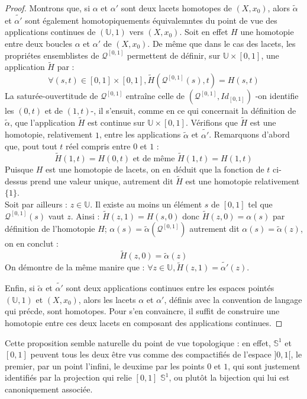 \begin{proof}
Montrons que, si $\alpha$ et $\alpha '$ sont deux lacets homotopes de $(X,x_0)$,%
alors $\tilde{\alpha}$ et $\tilde{\alpha '}$ sont \'egalement homotopiquements \'equivalemntes du point de vue des applications continues de $(\mathbb{U},1)$ vers $(X,x_0)$. %
Soit en effet $H$ une homotopie entre deux boucles $\alpha$ et $\alpha '$ de $(X,x_0)$. De m\^eme que dans le cas des lacets, les propri\'etes ensemblistes de $\mathcal{Q}^{[0,1]}$ permettent de d\'efinir, sur $\mathbb{U}\times [0,1]$, une application $\tilde{H}$ par :
\[\forall (s,t)\in[0,1]\times [0,1],\tilde{H}\left(\mathcal{Q}^{[0,1]}(s),t\right)=H(s,t)\]
La satur\'ee-ouvertitude de $\mathcal{Q}^{[0,1]}$ entra\^ine celle de $\left(\mathcal{Q}^{[0,1]},Id_{[0,1]}\right)$ -on identifie les $(0,t)$ et de $(1,t)$-, %
il s'ensuit, comme en  ce qui concernait la d\'efinition de $\tilde{\alpha}$, que l'application $\tilde{H}$ est continue sur $\mathbb{U}\times[0,1]$. %
V\'erifions que $\tilde{H}$ est une homotopie, relativement  $1$, entre les applications $\tilde{\alpha}$ et $\tilde{\alpha '}$.
Remarquons d'abord que, pout tout $t$ r\'eel compris entre $0$ et $1$ :
\[\tilde{H}(1,t)=H(0,t)\text{ et de m\^eme }\tilde{H}(1,t)=H(1,t)\]
Puisque $H$ est une homotopie de lacets, on en d\'eduit que la fonction de $t$ ci-dessus prend une valeur unique, %
autrement dit $\tilde{H}$ est une homotopie relativement  $\{1\}$.\\
Soit par ailleurs : $z\in\mathbb{U}$. Il existe au moins un \'el\'ement $s$ de $[0,1]$ tel que $\mathcal{Q}^{[0,1]}(s)$ vaut $z$. %
Ainsi : $\tilde{H}(z,1)=H(s,0)$ donc $\tilde{H}(z,0)=\alpha (s)$ par d\'efinition de l'homotopie $H$; %
$\alpha (s)=\tilde{\alpha}\left(\mathcal{Q}^{[0,1]}\right)$ autrement dit $\alpha (s)=\tilde{\alpha}(z)$, on en conclut :
\[\tilde{H}(z,0)=\tilde{\alpha}(z)\]
On d\'emontre de la m\^eme manire que : $\forall z \in\mathbb{U},\tilde{H}(z,1)=\tilde{\alpha '}(z)$.

Enfin, si $\tilde{\alpha}$ et $\tilde{\alpha '}$ sont deux applications continues entre les espaces point\'es $(\mathbb{U},1)$ et $(X,x_0)$, %
alors les lacets $\alpha$ et $\alpha '$, d\'efinis avec la convention de langage qui pr\'ecde, sont homotopes. %
Pour s'en convaincre, il suffit de construire une homotopie entre ces deux lacets en composant des applications continues.
\end{proof}

\begin{rema}
Cette proposition semble naturelle du point de vue topologique : %
en effet, $\mathbb{S}^1$ et $[0,1]$ peuvent tous les deux \^etre vus comme des compactifi\'es de l'espace $]0,1[$, %
le premier, par un point  l'infini, le deuxime par les points $0$ et $1$, %
qui sont justement identifi\'es par la projection qui relie $[0,1]$  $\mathbb{S}^1$, %
ou plut\^ot la bijection qui lui est canoniquement associ\'ee.
\end{rema}

